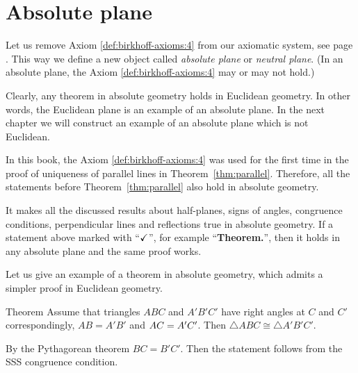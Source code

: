 \chapter{Absolute plane}\label{chap:non-euclid}

Let us remove Axiom \ref{def:birkhoff-axioms:4} from our axiomatic system, see page \pageref{def:birkhoff-axioms:0}.
This way we define a new object called 
\emph{absolute plane} or \emph{neutral plane}.
(In an absolute plane, the Axiom \ref{def:birkhoff-axioms:4} may or may not hold.)

Clearly, any theorem in absolute geometry holds in Euclidean geometry.
In other words, the Euclidean plane is an example of an absolute plane. 
In the next chapter we will construct an example of an absolute plane which is not Euclidean.

In this book, 
the Axiom \ref{def:birkhoff-axioms:4} was used
for the first time in the proof of uniqueness of parallel lines in Theorem~\ref{thm:parallel}.
Therefore, all the statements before Theorem~\ref{thm:parallel} also hold in absolute geometry.

It makes all the discussed results
about
half-planes,
signs of angles,
congruence conditions,
perpendicular lines and reflections 
true in absolute geometry.
If a statement above marked with ``$\checkmark$'',\label{a-mark} for example ``\textbf{Theorem.\abs}'', then it holds in any absolute plane and the same proof works.


Let us give an example of a theorem in absolute geometry,
which admits a simpler proof in Euclidean geometry. 

\begin{thm}{Theorem}
Assume that triangles $ABC$ and $A'B'C'$
have right angles at $C$ and $C'$ correspondingly, 
$AB=A'B'$ and $AC\z=A'C'$.
Then $\triangle ABC\cong\triangle A'B'C'$.
\end{thm}


By the Pythagorean theorem $BC=B'C'$.
Then the statement follows from the SSS congruence condition.
\qeds

